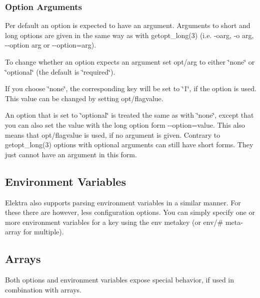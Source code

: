 \subsubsection*{Option Arguments}

Per default an option is expected to have an argument. Arguments to short and long options are given in the same way as with {\ttfamily getopt\+\_\+long(3)} (i.\+e. {\ttfamily -\/oarg}, {\ttfamily -\/o arg}, {\ttfamily -\/-\/option arg} or {\ttfamily -\/-\/option=arg}).

To change whether an option expects an argument set {\ttfamily opt/arg} to either {\ttfamily \char`\"{}none\char`\"{}} or {\ttfamily \char`\"{}optional\char`\"{}} (the default is {\ttfamily \char`\"{}required\char`\"{}}).


\begin{DoxyItemize}
\item If you choose {\ttfamily \char`\"{}none\char`\"{}}, the corresponding key will be set to {\ttfamily \char`\"{}1\char`\"{}}, if the option is used. This value can be changed by setting {\ttfamily opt/flagvalue}.
\item An option that is set to {\ttfamily \char`\"{}optional\char`\"{}} is treated the same as with {\ttfamily \char`\"{}none\char`\"{}}, except that you can also set the value with the long option form {\ttfamily -\/-\/option=value}. This also means that {\ttfamily opt/flagvalue} is used, if no argument is given. Contrary to {\ttfamily getopt\+\_\+long(3)} options with optional arguments can still have short forms. They just cannot have an argument in this form.
\end{DoxyItemize}

\subsection*{Environment Variables}

Elektra also supports parsing environment variables in a similar manner. For these there are however, less configuration options. You can simply specify one or more environment variables for a key using the {\ttfamily env} metakey (or {\ttfamily env/\#} meta-\/array for multiple).

\subsection*{Arrays}

Both options and environment variables expose special behavior, if used in combination with arrays.

